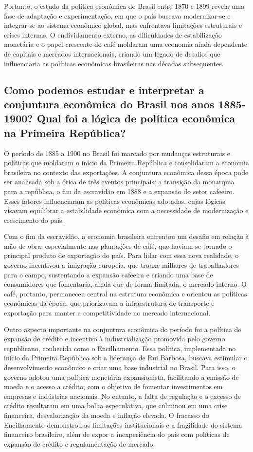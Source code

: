 \documentclass[a4paper,12pt]{article}[abntex2]
\begin{document}
Portanto, o estudo da política econômica do Brasil entre 1870 e 1899 revela uma fase de adaptação e experimentação, em que o país buscava modernizar-se e integrar-se ao sistema econômico global, mas enfrentava limitações estruturais e crises internas. O endividamento externo, as dificuldades de estabilização monetária e o papel crescente do café moldaram uma economia ainda dependente de capitais e mercados internacionais, criando um legado de desafios que influenciaria as políticas econômicas brasileiras nas décadas subsequentes.

\subsection{\textbf{Como podemos estudar e interpretar a conjuntura econômica do Brasil nos anos 1885-1900? Qual foi a lógica de política econômica na Primeira República?}}

O período de 1885 a 1900 no Brasil foi marcado por mudanças estruturais e políticas que moldaram o início da Primeira República e consolidaram a economia brasileira no contexto das exportações. A conjuntura econômica dessa época pode ser analisada sob a ótica de três eventos principais: a transição da monarquia para a república, o fim da escravidão em 1888 e a expansão do setor cafeeiro. Esses fatores influenciaram as políticas econômicas adotadas, cujas lógicas visavam equilibrar a estabilidade econômica com a necessidade de modernização e crescimento do país.

Com o fim da escravidão, a economia brasileira enfrentou um desafio em relação à mão de obra, especialmente nas plantações de café, que haviam se tornado o principal produto de exportação do país. Para lidar com essa nova realidade, o governo incentivou a imigração europeia, que trouxe milhares de trabalhadores para o campo, sustentando a expansão cafeeira e criando uma base de consumidores que fomentaria, ainda que de forma limitada, o mercado interno. O café, portanto, permaneceu central na estrutura econômica e orientou as políticas econômicas da época, que priorizavam a infraestrutura de transporte e exportação para manter a competitividade no mercado internacional.

Outro aspecto importante na conjuntura econômica do período foi a política de expansão de crédito e incentivo à industrialização promovida pelo governo republicano, conhecida como o Encilhamento. Essa política, implementada no início da Primeira República sob a liderança de Rui Barbosa, buscava estimular o desenvolvimento econômico e criar uma base industrial no Brasil. Para isso, o governo adotou uma política monetária expansionista, facilitando a emissão de moeda e o acesso a crédito, com o objetivo de fomentar investimentos em empresas e indústrias nacionais. No entanto, a falta de regulação e o excesso de crédito resultaram em uma bolha especulativa, que culminou em uma crise financeira, desvalorização da moeda e inflação elevada. O fracasso do Encilhamento demonstrou as limitações institucionais e a fragilidade do sistema financeiro brasileiro, além de expor a inexperiência do país com políticas de expansão de crédito e regulamentação de mercado.
\end{document}
